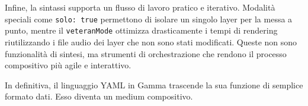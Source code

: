Infine, la sintassi supporta un flusso di lavoro pratico e iterativo. Modalità speciali come \texttt{solo: true} permettono di isolare un singolo layer per la messa a punto, mentre il \texttt{veteranMode} ottimizza drasticamente i tempi di rendering riutilizzando i file audio dei layer che non sono stati modificati. Queste non sono funzionalità di sintesi, ma strumenti di orchestrazione che rendono il processo compositivo più agile e interattivo.

In definitiva, il linguaggio YAML in Gamma trascende la sua funzione di semplice formato dati. Esso diventa un medium compositivo. 